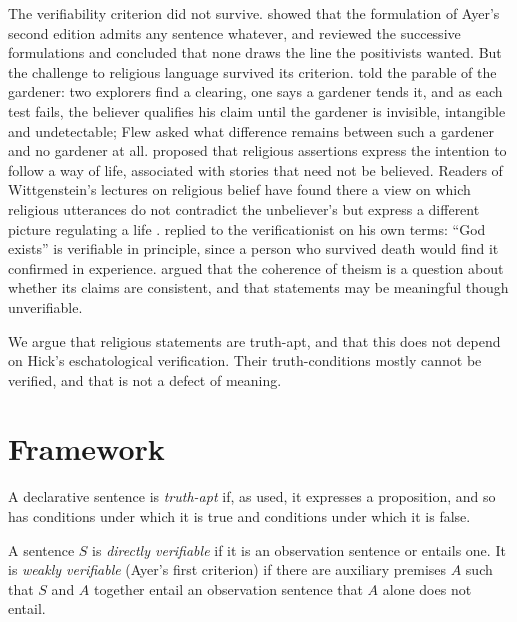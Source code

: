 \documentclass{situationist-preprint}
\begin{document}
The verifiability criterion did not survive. \citet{Church1949} showed that the formulation of Ayer's second edition admits any sentence whatever, and \citet{Hempel1950} reviewed the successive formulations and concluded that none draws the line the positivists wanted. But the challenge to religious language survived its criterion. \citet{Flew1955} told the parable of the gardener: two explorers find a clearing, one says a gardener tends it, and as each test fails, the believer qualifies his claim until the gardener is invisible, intangible and undetectable; Flew asked what difference remains between such a gardener and no gardener at all. \citet{Braithwaite1955} proposed that religious assertions express the intention to follow a way of life, associated with stories that need not be believed. Readers of Wittgenstein's lectures on religious belief have found there a view on which religious utterances do not contradict the unbeliever's but express a different picture regulating a life \citep{Wittgenstein1966}. \citet{Hick1960} replied to the verificationist on his own terms: \enquote{God exists} is verifiable in principle, since a person who survived death would find it confirmed in experience. \citet{Swinburne1977} argued that the coherence of theism is a question about whether its claims are consistent, and that statements may be meaningful though unverifiable.

We argue that religious statements are truth-apt, and that this does not depend on Hick's eschatological verification. Their truth-conditions mostly cannot be verified, and that is not a defect of meaning.

\section{Framework}

\begin{definition}\label{d:apt}
A declarative sentence is \emph{truth-apt} if, as used, it expresses a proposition, and so has conditions under which it is true and conditions under which it is false.
\end{definition}

\begin{definition}[Verifiability]\label{d:verif}
A sentence $S$ is \emph{directly verifiable} if it is an observation sentence or entails one. It is \emph{weakly verifiable} (Ayer's first criterion) if there are auxiliary premises $A$ such that $S$ and $A$ together entail an observation sentence that $A$ alone does not entail.
\end{definition}
\end{document}
